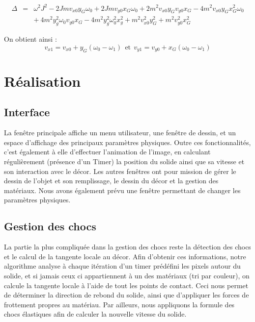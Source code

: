 \begin{eqnarray*}
	\Delta & = & \omega^2 J^2 -2Jmv_{x0}y_G\omega_0 + 2Jmv_{y0}x_G \omega_0  + 2m^2v_{x0}y_Gv_{y0}x_G - 4m^2v_{x0}y_Gx^2_G\omega_0 \\
		& & +\ 4m^2y^2_g\omega_0 v_{y0} x_G- 4m^2y^2_g\omega^2_0x^2_g + m^2v^2_{x0}y^2_G + m^2v^2_{y0}x^2_G
\end{eqnarray*}

On obtient ainsi :
\begin{equation}
v_{x1}=v_{x0} +y_G(\omega_0 - \omega_1) \: \ \text{et} \ \:  v_{y1}=v_{y0} +x_G(\omega_0 - \omega_1)
\end{equation} 

\newpage

\section{Réalisation}
\subsection{Interface}
La fenêtre principale affiche un menu utilisateur, une fenêtre de dessin,
et un espace d'affichage des principaux paramètres physiques.
Outre ces fonctionnalités, c'est également à elle d'effectuer l'animation
de l'image, en calculant régulièrement (présence d'un Timer) la position
du solide ainsi que sa vitesse et son interaction avec le décor.
Les autres fenêtres ont pour mission de gérer le dessin de l'objet et son remplissage,
le dessin du décor et la gestion des matériaux.
Nous avons également prévu une fenêtre permettant de changer les paramètres physiques.

\subsection{Gestion des chocs}
La partie la plus compliquée dans la gestion des chocs reste la détection des chocs
et le calcul de la tangente locale au décor. Afin d'obtenir ces informations,
notre algorithme analyse à chaque itération d'un timer prédéfini
les pixels autour du solide, et si jamais ceux ci appartiennent à un des
matériaux (tri par couleur), on calcule la tangente locale à l'aide de
tout les points de contact. Ceci nous permet de déterminer la direction 
de rebond du solide, ainsi que d'appliquer les forces de frottement propres au matériau.
Par ailleurs, nous appliquons la formule des chocs élastiques afin de
calculer la nouvelle vitesse du solide.


